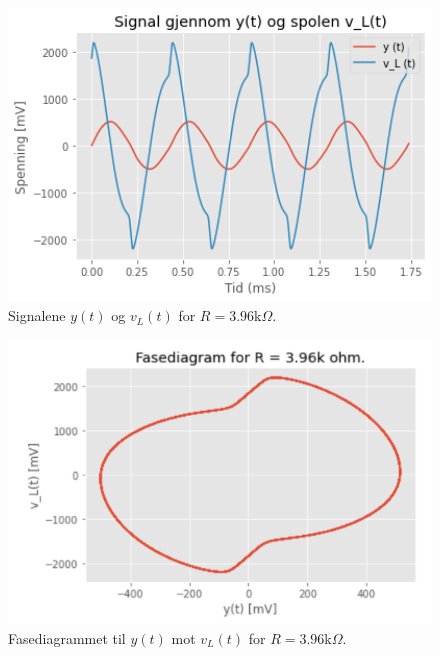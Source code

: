 \documentclass[a4paper,11pt,norsk]{article}
\begin{document}
\begin{figure}[htbp]
    \centering
    \includegraphics[width=1.0\textwidth]{img/os_R_3_96.png}
    \caption{Signalene $y(t)$ og $v_L(t)$ for $R = 3.96$k$\Omega$.}
    \label{fig: oscilloskop størst SNR}
\end{figure}
\newpage

\begin{figure}[htbp]
    \centering
    \includegraphics[width=1.0\textwidth]{img/fdg_R_3_96.png}
    \caption{Fasediagrammet til $y(t)$ mot $v_L(t)$ for $R = 3.96$k$\Omega$.}
    \label{fig: fasediagram størst SNR}
\end{figure}\newpage
\end{document}
